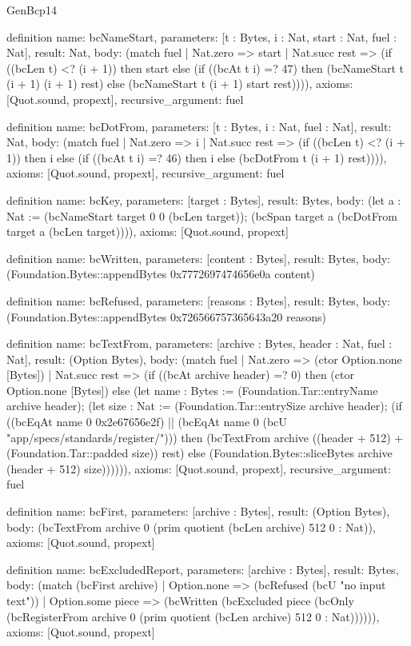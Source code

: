 \begin{lexlean}{GenBcp14}
\begin{semanticmodule}
definition{
  name: bcNameStart,
  parameters: [t : Bytes, i : Nat, start : Nat, fuel : Nat],
  result: Nat,
  body: (match fuel
    | Nat.zero => start
    | Nat.succ rest => (if ((bcLen t) <? (i + 1)) then start else (if ((bcAt t i) =? 47) then (bcNameStart t (i + 1) (i + 1) rest) else (bcNameStart t (i + 1) start rest)))),
  axioms: [Quot.sound, propext],
  recursive_argument: fuel
}

definition{
  name: bcDotFrom,
  parameters: [t : Bytes, i : Nat, fuel : Nat],
  result: Nat,
  body: (match fuel
    | Nat.zero => i
    | Nat.succ rest => (if ((bcLen t) <? (i + 1)) then i else (if ((bcAt t i) =? 46) then i else (bcDotFrom t (i + 1) rest)))),
  axioms: [Quot.sound, propext],
  recursive_argument: fuel
}

definition{
  name: bcKey,
  parameters: [target : Bytes],
  result: Bytes,
  body: (let a : Nat := (bcNameStart target 0 0 (bcLen target)); (bcSpan target a (bcDotFrom target a (bcLen target)))),
  axioms: [Quot.sound, propext]
}

definition{
  name: bcWritten,
  parameters: [content : Bytes],
  result: Bytes,
  body: (Foundation.Bytes::appendBytes 0x7772697474656e0a content)
}

definition{
  name: bcRefused,
  parameters: [reasons : Bytes],
  result: Bytes,
  body: (Foundation.Bytes::appendBytes 0x726566757365643a20 reasons)
}

definition{
  name: bcTextFrom,
  parameters: [archive : Bytes, header : Nat, fuel : Nat],
  result: (Option Bytes),
  body: (match fuel
    | Nat.zero => (ctor Option.none [Bytes])
    | Nat.succ rest => (if ((bcAt archive header) =? 0) then (ctor Option.none [Bytes]) else (let name : Bytes := (Foundation.Tar::entryName archive header); (let size : Nat := (Foundation.Tar::entrySize archive header); (if ((bcEqAt name 0 0x2e67656e2f) || (bcEqAt name 0 (bcU "app/specs/standards/register/"))) then (bcTextFrom archive ((header + 512) + (Foundation.Tar::padded size)) rest) else (Foundation.Bytes::sliceBytes archive (header + 512) size)))))),
  axioms: [Quot.sound, propext],
  recursive_argument: fuel
}

definition{
  name: bcFirst,
  parameters: [archive : Bytes],
  result: (Option Bytes),
  body: (bcTextFrom archive 0 (prim quotient (bcLen archive) 512 0 : Nat)),
  axioms: [Quot.sound, propext]
}

definition{
  name: bcExcludedReport,
  parameters: [archive : Bytes],
  result: Bytes,
  body: (match (bcFirst archive)
    | Option.none => (bcRefused (bcU "no input text"))
    | Option.some piece => (bcWritten (bcExcluded piece (bcOnly (bcRegisterFrom archive 0 (prim quotient (bcLen archive) 512 0 : Nat)))))),
  axioms: [Quot.sound, propext]
}


\end{semanticmodule}
\end{lexlean}
